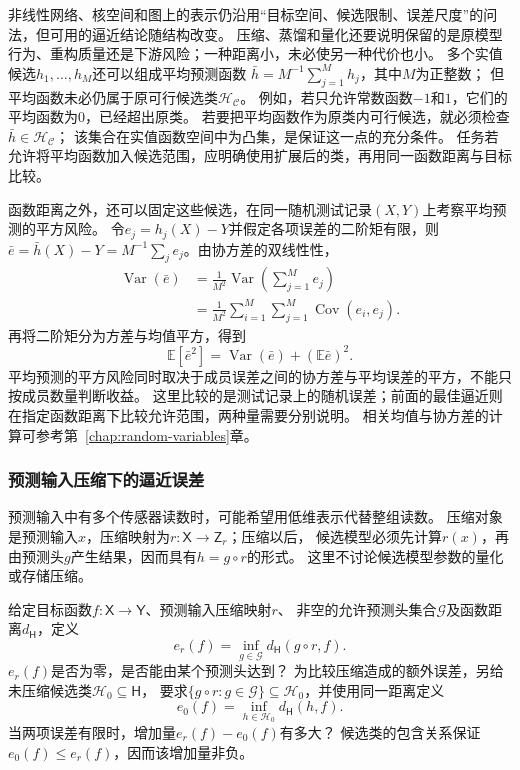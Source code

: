 非线性网络、核空间和图上的表示仍沿用“目标空间、候选限制、误差尺度”的问法，但可用的逼近结论随结构改变。
压缩、蒸馏和量化还要说明保留的是原模型行为、重构质量还是下游风险；一种距离小，未必使另一种代价也小。
多个实值候选$h_1,\ldots,h_M$还可以组成平均预测函数
$\bar h=M^{-1}\sum_{j=1}^M h_j$，其中$M$为正整数；
但平均函数未必仍属于原可行候选类$\mathcal H_{\mathcal C}$。
例如，若只允许常数函数$-1$和$1$，它们的平均函数为$0$，已经超出原类。
若要把平均函数作为原类内可行候选，就必须检查$\bar h\in\mathcal H_{\mathcal C}$；
该集合在实值函数空间中为凸集，是保证这一点的充分条件。
任务若允许将平均函数加入候选范围，应明确使用扩展后的类，再用同一函数距离与目标比较。

函数距离之外，还可以固定这些候选，在同一随机测试记录$(X,Y)$上考察平均预测的平方风险。
令$e_j=h_j(X)-Y$并假定各项误差的二阶矩有限，则
$\bar e=\bar h(X)-Y=M^{-1}\sum_j e_j$。由协方差的双线性性，
\[
  \begin{aligned}
    \operatorname{Var}(\bar e)
      &=\frac1{M^2}\operatorname{Var}\!\left(\sum_{j=1}^M e_j\right)\\
      &=\frac1{M^2}\sum_{i=1}^M\sum_{j=1}^M\operatorname{Cov}(e_i,e_j).
  \end{aligned}
\]
再将二阶矩分为方差与均值平方，得到
\[
  \mathbb E[\bar e^2]=\operatorname{Var}(\bar e)+(\mathbb E\bar e)^2.
\]
平均预测的平方风险同时取决于成员误差之间的协方差与平均误差的平方，不能只按成员数量判断收益。
这里比较的是测试记录上的随机误差；前面的最佳逼近则在指定函数距离下比较允许范围，两种量需要分别说明。
相关均值与协方差的计算可参考第~\ref{chap:random-variables}章。

\subsubsection{预测输入压缩下的逼近误差}
\label{sec:future-analysis-input-compression}

预测输入中有多个传感器读数时，可能希望用低维表示代替整组读数。
压缩对象是预测输入$x$，压缩映射为$r:\mathsf X\to\mathsf Z_r$；压缩以后，
候选模型必须先计算$r(x)$，再由预测头$g$产生结果，因而具有$h=g\circ r$的形式。
这里不讨论候选模型参数的量化或存储压缩。

\begin{mathproblem}[预测输入压缩造成的最佳逼近误差]
  \label{question:future-input-compression}
  给定目标函数$f:\mathsf X\to\mathsf Y$、预测输入压缩映射$r$、
  非空的允许预测头集合$\mathcal G$及函数距离$d_{\mathsf H}$，定义
  \[
    e_r(f)=\inf_{g\in\mathcal G}d_{\mathsf H}(g\circ r,f).
  \]
  $e_r(f)$是否为零，是否能由某个预测头达到？
  为比较压缩造成的额外误差，另给未压缩候选类$\mathcal H_0\subseteq\mathsf H$，
  要求$\{g\circ r:g\in\mathcal G\}\subseteq\mathcal H_0$，并使用同一距离定义
  \[
    e_0(f)=\inf_{h\in\mathcal H_0}d_{\mathsf H}(h,f).
  \]
  当两项误差有限时，增加量$e_r(f)-e_0(f)$有多大？
  候选类的包含关系保证$e_0(f)\leq e_r(f)$，因而该增加量非负。
\end{mathproblem}

